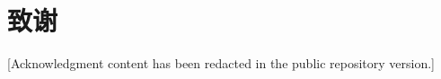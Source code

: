 \clearpage
\section*{致\quad 谢}

{\songti

[Acknowledgment content has been redacted in the public repository version.]

}
